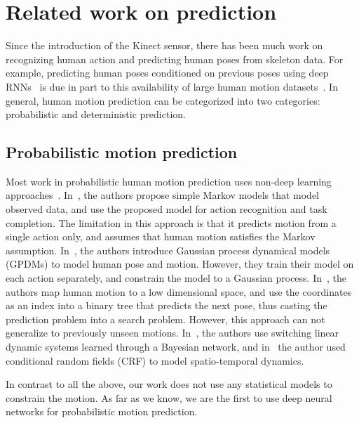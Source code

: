\documentclass[10pt,twocolumn,letterpaper]{article}
\begin{document}
\section{Related work on prediction}

Since the introduction of the Kinect sensor, there has been much work on recognizing human action and predicting human poses from skeleton data. For example, predicting human poses conditioned on previous poses using deep RNNs~\cite{iccv2015:Katerina, cvpr2016:Ashesh, cvpr2017:julieta} is due in part to this availability of large human motion datasets~\cite{pami2014:Ionescu,iccv2011:Ionescu,cvpr2016:Shahroudy}. In general, human motion prediction can be categorized into two categories: probabilistic and deterministic prediction.

\subsection{Probabilistic motion prediction}

Most work in probabilistic human motion prediction uses non-deep learning approaches~\cite{nips2000:Pavlovic, eccv2002:Sidenbladh, nips2005:Wang, pami2008:Wang, icml2013:Hema, cvpr2014:Lehrmann, iccv2015:Katerina}. In~\cite{cvpr2014:Lehrmann}, the authors propose simple Markov models that model observed data, and use the proposed model for action recognition and task completion. The limitation in this approach is that it predicts motion from a single action only, and assumes that human motion satisfies the Markov assumption. In~\cite{pami2008:Wang}, the authors introduce Gaussian process dynamical models (GPDMs) to model human pose and motion. However, they train their model on each action separately, and constrain the model to a Gaussian process. In~\cite{eccv2002:Sidenbladh}, the authors map human motion to a low dimensional space, and use the coordinates as an index into a binary tree that predicts the next pose, thus casting the prediction problem into a search problem. However, this approach can not generalize to previously unseen motions. In~\cite{nips2000:Pavlovic}, the authors use switching linear dynamic systems learned through a Bayesian network, and in~\cite{icml2013:Hema} the author used conditional random fields (CRF) to model spatio-temporal dynamics.

In contrast to all the above, our work does not use any statistical models to constrain the motion. As far as we know, we are the first to use deep neural networks for probabilistic motion prediction.
\end{document}
